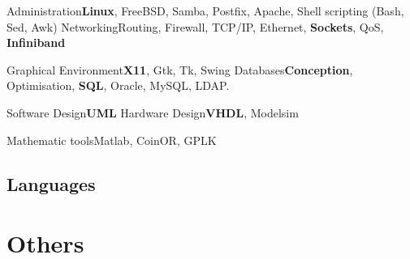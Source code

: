 \documentclass[10pt,a4paper]{moderncv}
\begin{document}
\cvcomputer
{Administration}{\textbf{Linux}, FreeBSD, Samba, Postfix, Apache, Shell scripting (Bash, Sed, Awk)}
{Networking}{Routing, Firewall, TCP/IP, Ethernet, \textbf{Sockets}, QoS, \textbf{Infiniband}}

\cvcomputer
{Graphical Environment}{\textbf{X11}, Gtk, Tk, Swing}
{Databases}{\textbf{Conception}, Optimisation, \textbf{SQL}, Oracle, MySQL, LDAP.}

\cvcomputer
{Software Design}{\textbf{UML}}
{Hardware Design}{\textbf{VHDL}, Modelsim}

\cvcomputer
{Mathematic tools}{Matlab, CoinOR, GPLK}{}{}

\subsection{Languages}

\section{Others}
\end{document}
